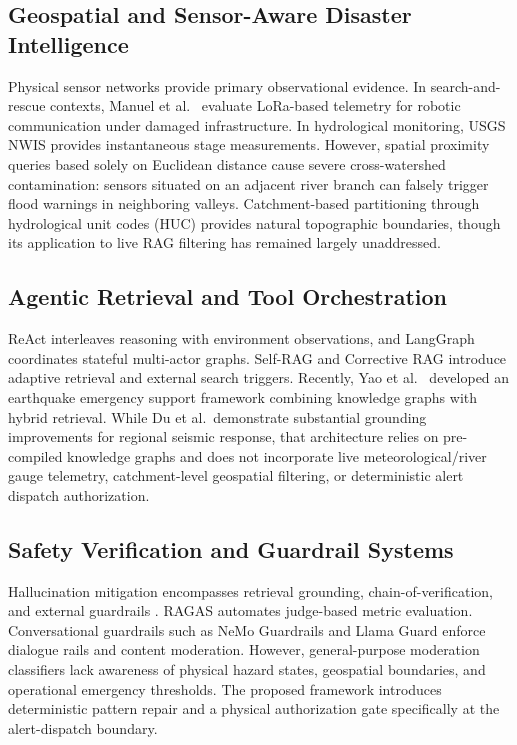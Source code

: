 \documentclass[conference]{IEEEtran}
\begin{document}
\subsection{Geospatial and Sensor-Aware Disaster Intelligence}
Physical sensor networks provide primary observational evidence. In search-and-rescue contexts, Manuel et al.\ \cite{manuel2024} evaluate LoRa-based telemetry for robotic communication under damaged infrastructure. In hydrological monitoring, USGS NWIS \cite{usgsnwis} provides instantaneous stage measurements. However, spatial proximity queries based solely on Euclidean distance cause severe cross-watershed contamination: sensors situated on an adjacent river branch can falsely trigger flood warnings in neighboring valleys. Catchment-based partitioning through hydrological unit codes (HUC) provides natural topographic boundaries, though its application to live RAG filtering has remained largely unaddressed.

\subsection{Agentic Retrieval and Tool Orchestration}
ReAct \cite{react} interleaves reasoning with environment observations, and LangGraph \cite{langgraph} coordinates stateful multi-actor graphs. Self-RAG \cite{selfrag} and Corrective RAG \cite{crag} introduce adaptive retrieval and external search triggers. Recently, Yao et al.\ \cite{zhang2024} developed an earthquake emergency support framework combining knowledge graphs with hybrid retrieval. While Du et al.\ demonstrate substantial grounding improvements for regional seismic response, that architecture relies on pre-compiled knowledge graphs and does not incorporate live meteorological/river gauge telemetry, catchment-level geospatial filtering, or deterministic alert dispatch authorization.

\subsection{Safety Verification and Guardrail Systems}
Hallucination mitigation encompasses retrieval grounding, chain-of-verification, and external guardrails \cite{ji,yu2024}. RAGAS \cite{ragas} automates judge-based metric evaluation. Conversational guardrails such as NeMo Guardrails \cite{nemoguardrails} and Llama Guard \cite{inan2023} enforce dialogue rails and content moderation. However, general-purpose moderation classifiers lack awareness of physical hazard states, geospatial boundaries, and operational emergency thresholds. The proposed framework introduces deterministic pattern repair and a physical authorization gate specifically at the alert-dispatch boundary.
\end{document}
